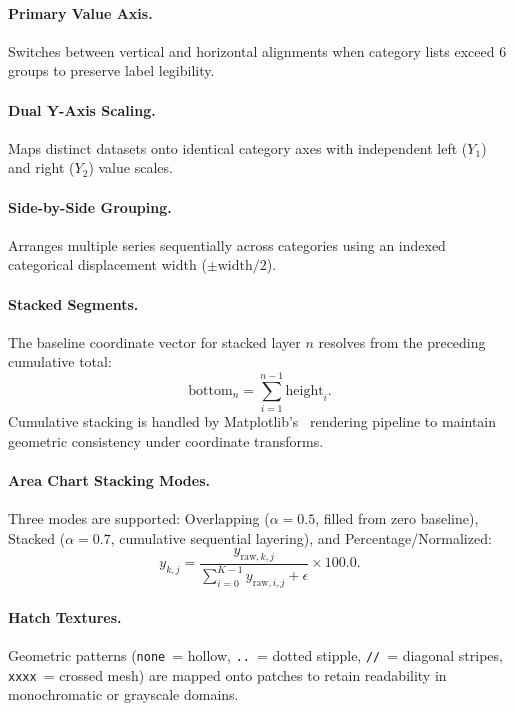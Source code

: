 \documentclass[11pt,twocolumn]{article}
\begin{document}
\paragraph{Primary Value Axis.} Switches between vertical and horizontal alignments when category lists exceed 6 groups to preserve label legibility.

\paragraph{Dual Y-Axis Scaling.} Maps distinct datasets onto identical category axes with independent left ($Y_1$) and right ($Y_2$) value scales.

\paragraph{Side-by-Side Grouping.} Arranges multiple series sequentially across categories using an indexed categorical displacement width ($\pm\text{width}/2$).

\paragraph{Stacked Segments.} The baseline coordinate vector for stacked layer $n$ resolves from the preceding cumulative total:
\begin{equation}\label{eq:stacked_bottom}
  \text{bottom}_n = \sum_{i=1}^{n-1} \text{height}_i.
\end{equation}
Cumulative stacking is handled by Matplotlib's~\cite{hunter2007matplotlib} rendering pipeline to maintain geometric consistency under coordinate transforms.

\paragraph{Area Chart Stacking Modes.} Three modes are supported: Overlapping ($\alpha=0.5$, filled from zero baseline), Stacked ($\alpha=0.7$, cumulative sequential layering), and Percentage/Normalized:
\begin{equation}\label{eq:pct_norm}
  y_{k,j} = \frac{y_{\text{raw},k,j}}{\sum_{i=0}^{K-1} y_{\text{raw},i,j} + \epsilon}\times 100.0.
\end{equation}

\paragraph{Hatch Textures.} Geometric patterns (\texttt{none}~= hollow, \texttt{..}~= dotted stipple, \texttt{//}~= diagonal stripes, \texttt{xxxx}~= crossed mesh) are mapped onto patches to retain readability in monochromatic or grayscale domains.
\end{document}
